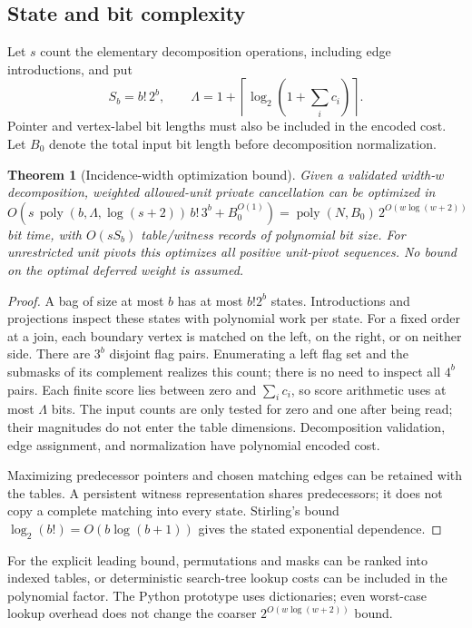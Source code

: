 \documentclass[11pt,a4paper]{article}
\newtheorem{theorem}{Theorem}[section]
\theoremstyle{definition}
\theoremstyle{remark}
\begin{document}
\subsection{State and bit complexity}
Let $s$ count the elementary decomposition operations, including edge
introductions, and put
\[
 S_b=b!\,2^b,\qquad
 \Lambda=1+\left\lceil\log_2\left(1+\sum_i c_i\right)\right\rceil.
\]
Pointer and vertex-label bit lengths must also be included in the encoded
cost. Let $B_0$ denote the total input bit length before decomposition
normalization.

\begin{theorem}[Incidence-width optimization bound]
\label{thm:widthbound}
Given a validated width-$w$ decomposition, weighted allowed-unit private
cancellation can be optimized in
\begin{equation}
 O\!\left(s\,\operatorname{poly}(b,\Lambda,\log(s+2))\,b!\,3^b+B_0^{O(1)}\right)
 =\operatorname{poly}(N,B_0)\,2^{O(w\log(w+2))}
 \label{eq:time}
\end{equation}
bit time, with $O(sS_b)$ table/witness records of polynomial bit size.
For unrestricted unit pivots this optimizes all positive unit-pivot
sequences. No bound on the optimal deferred weight is assumed.
\end{theorem}
\begin{proof}
A bag of size at most $b$ has at most $b!2^b$ states. Introductions and
projections inspect these states with polynomial work per state. For a
fixed order at a join, each boundary vertex is matched on the left, on the
right, or on neither side. There are $3^b$ disjoint flag pairs. Enumerating
a left flag set and the submasks of its complement realizes this count;
there is no need to inspect all $4^b$ pairs. Each finite score lies between
zero and $\sum_i c_i$, so score arithmetic uses at most $\Lambda$ bits.
The input counts are only tested for zero and one after being read; their
magnitudes do not enter the table dimensions. Decomposition validation,
edge assignment, and normalization have polynomial encoded cost.

Maximizing predecessor pointers and chosen matching edges can be retained
with the tables. A persistent witness representation shares predecessors;
it does not copy a complete matching into every state. Stirling's bound
$\log_2(b!)=O(b\log(b+1))$ gives the stated exponential dependence.
\end{proof}

For the explicit leading bound, permutations and masks can be ranked into
indexed tables, or deterministic search-tree lookup costs can be included
in the polynomial factor. The Python prototype uses dictionaries; even
worst-case lookup overhead does not change the coarser
$2^{O(w\log(w+2))}$ bound.
\end{document}
